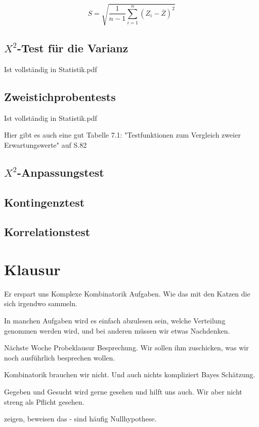 \documentclass[a4paper]{article}
\begin{document}
\begin{equation*}
    S = \sqrt{\frac{1}{n-1} \sum_{i=1}^{n} (Z_i - \overline{Z})^2}
\end{equation*}

\subsection{$X^2$-Test für die Varianz}

Ist vollständig in Statistik.pdf

\subsection{Zweistichprobentests}

Ist vollständig in Statistik.pdf

Hier gibt es auch eine gut Tabelle 7.1: "Testfunktionen zum Vergleich zweier Erwartungswerte" auf S.82 

\subsection{$X^2$-Anpassungstest}



\subsection{Kontingenztest}



\subsection{Korrelationstest}





\section{Klausur}

Er erspart uns Komplexe Kombinatorik Aufgaben. Wie das mit den Katzen die sich irgendwo sammeln.

In manchen Aufgaben wird es einfach abzulesen sein, welche Verteilung genommen werden wird, und bei anderen müssen wir etwas Nachdenken.


Nächste Woche Probeklausur Besprechung. Wir sollen ihm zuschicken, was wir noch ausführlich besprechen wollen.


Kombinatorik brauchen wir nicht. Und auch nichts kompliziert Bayes Schätzung.

Gegeben und Gesucht wird gerne gesehen und hilft uns auch. Wir aber nicht streng als Pflicht gesehen.

zeigen, beweisen das - sind häufig Nullhypothese.
\end{document}
